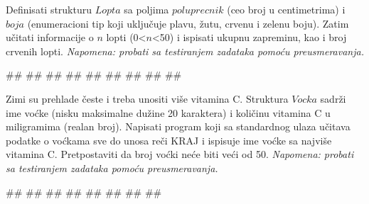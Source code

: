 \begin{Exercise}[label=p2.5_] 
Definisati strukturu $Lopta$ sa poljima $poluprecnik$ (ceo broj u centimetrima) i $boja$ (enumeracioni tip koji uključuje plavu, žutu, crvenu i zelenu boju). Zatim učitati informacije o $n$ lopti (0<$n$<50) i ispisati ukupnu zapreminu, kao i broj crvenih lopti. \textit{Napomena: probati sa testiranjem zadataka pomoću preusmeravanja.}\\
\begin{maxitest}
\begin{upotreba}{1}
#\naslovInt#
##
##
##
##
##
##
##
##
\end{upotreba}
\end{maxitest}

\end{Exercise}
\begin{Answer}[ref=p2.5_]
\end{Answer}

\begin{Exercise}[label=p2.5_] 
 Zimi su prehlade česte i treba unositi više vitamina C. Struktura $Vocka$ sadrži ime voćke (nisku maksimalne dužine 20 karaktera) i količinu vitamina C u miligramima (realan broj). Napisati program koji sa standardnog ulaza učitava podatke o voćkama sve do unosa reči KRAJ i ispisuje ime voćke sa najviše vitamina C. Pretpostaviti da broj voćki neće biti veći od 50. \textit{Napomena: probati sa testiranjem zadataka pomoću preusmeravanja.}\\
\begin{maxitest}
\begin{upotreba}{1}
#\naslovInt#
##
##
##
##
##
##
##
\end{upotreba}
\end{maxitest}

\end{Exercise}
\begin{Answer}[ref=p2.5_]
\end{Answer}

